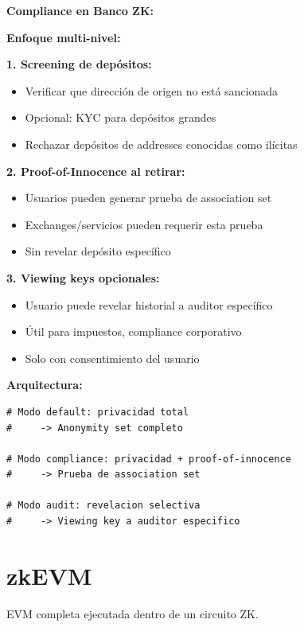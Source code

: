 \documentclass[11pt,a4paper,twoside]{book}
\begin{document}
\begin{bancozk}
\textbf{Compliance en Banco ZK:}

\textbf{Enfoque multi-nivel:}

\textbf{1. Screening de dep\'ositos:}
\begin{itemize}
    \item Verificar que direcci\'on de origen no est\'a sancionada
    \item Opcional: KYC para dep\'ositos grandes
    \item Rechazar dep\'ositos de addresses conocidas como il\'icitas
\end{itemize}

\textbf{2. Proof-of-Innocence al retirar:}
\begin{itemize}
    \item Usuarios pueden generar prueba de association set
    \item Exchanges/servicios pueden requerir esta prueba
    \item Sin revelar dep\'osito espec\'ifico
\end{itemize}

\textbf{3. Viewing keys opcionales:}
\begin{itemize}
    \item Usuario puede revelar historial a auditor espec\'ifico
    \item \'Util para impuestos, compliance corporativo
    \item Solo con consentimiento del usuario
\end{itemize}

\textbf{Arquitectura:}
\begin{lstlisting}[style=python]
# Modo default: privacidad total
#     -> Anonymity set completo
    
# Modo compliance: privacidad + proof-of-innocence
#     -> Prueba de association set
    
# Modo audit: revelacion selectiva
#     -> Viewing key a auditor especifico
\end{lstlisting}
\end{bancozk}

\section{zkEVM}

\begin{definition}[zkEVM]
EVM completa ejecutada dentro de un circuito ZK.
\end{definition}
\end{document}
